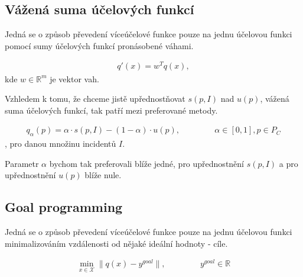 
\subsection{Vážená suma účelových funkcí}\label{kap:vazenaSumaUcelF}

Jedná se o způsob převedení víceúčelové funkce pouze na jednu účelovou funkci pomocí sumy účelových funkcí pronásobené váhami.

\begin{definice}
  \begin{align*}
    q'(x) = w^T q(x),
  \end{align*}
  kde $w \in \mathbb{R}^m$ je vektor vah.
  \\
\end{definice}

Vzhledem k tomu, že chceme jistě upřednostňovat $s(p, I)$ nad $u(p)$, vážená suma účelových funkcí, tak patří mezi preferované metody.

\begin{definice}
  \begin{align*}
    q_{\alpha}(p) = \alpha \cdot s(p, I) - (1 - \alpha) \cdot u(p), \hspace{50pt} \alpha \in [0, 1], p \in P_C
  \end{align*}
  , pro danou množinu incidentů $I$.
  \\
\end{definice}

Parametr $\alpha$ bychom tak preferovali blíže jedné, pro upřednostnění $s(p, I)$ a pro upřednostnění $u(p)$ blíže nule.

\subsection{Goal programming}\label{kap:goalP}

Jedná se o způsob převedení víceúčelové funkce pouze na jednu účelovou funkci minimalizováním vzdálenosti od nějaké ideální hodnoty - cíle. 

\begin{definice}
  \begin{align*}
    \min_{x \in \mathcal{X}} \| q(x) - y^{goal} \|, \hspace{50pt} y^{goal} \in \mathbb{R}
  \end{align*}
  \\
\end{definice}

